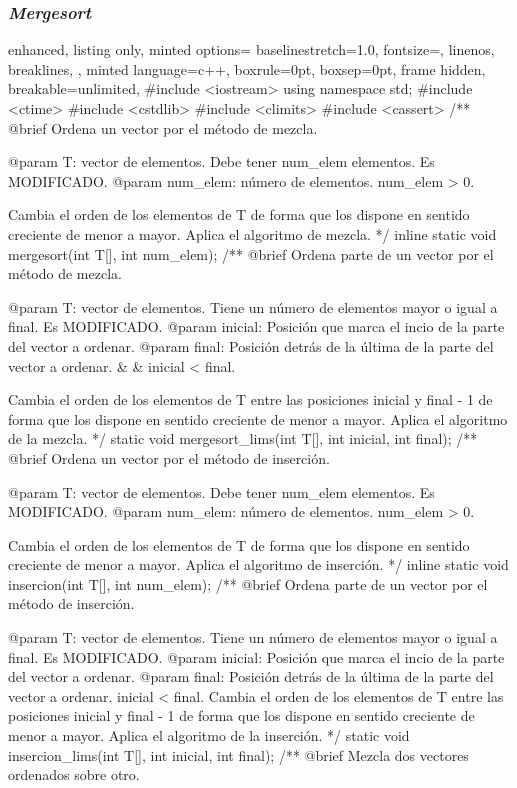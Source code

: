 \documentclass[12pt,spanish]{article}
\begin{document}
\subsubsection{\textit{Mergesort}}

\begin{multicols}{2}
\begin{tcblisting}
{
  enhanced,
  listing only,
  minted options={
    baselinestretch=1.0,
    fontsize=\footnotesize,
    linenos,
    breaklines,
  },
  minted language=c++,
  boxrule=0pt,
  boxsep=0pt,
  frame hidden,
  breakable=unlimited,
} 
#include <iostream>
using namespace std;
#include <ctime>
#include <cstdlib>
#include <climits>
#include <cassert>
/**
   @brief Ordena un vector por el método de mezcla.

   @param T: vector de elementos. Debe tener num_elem elementos.
             Es MODIFICADO.
   @param num_elem: número de elementos. num_elem > 0.

   Cambia el orden de los elementos de T de forma que los dispone
   en sentido creciente de menor a mayor. Aplica el algoritmo de mezcla.
*/
inline static 
void mergesort(int T[], int num_elem);
/**
   @brief Ordena parte de un vector por el método de mezcla.

   @param T: vector de elementos. Tiene un número de elementos 
                   mayor o igual a final. Es MODIFICADO.
   @param inicial: Posición que marca el incio de la parte del
                   vector a ordenar.
   @param final: Posición detrás de la última de la parte del
                   vector a ordenar. 
 &  &    inicial < final.

   Cambia el orden de los elementos de T entre las posiciones
   inicial y final - 1 de forma que los dispone en sentido creciente
   de menor a mayor. Aplica el algoritmo de la mezcla.
*/
static void mergesort_lims(int T[], int inicial, int final);
/**
   @brief Ordena un vector por el método de inserción.

   @param T: vector de elementos. Debe tener num_elem elementos.
             Es MODIFICADO.
   @param num_elem: número de elementos. num_elem > 0.

   Cambia el orden de los elementos de T de forma que los dispone
   en sentido creciente de menor a mayor. Aplica el algoritmo de inserción.
*/
inline static 
void insercion(int T[], int num_elem);
/**
   @brief Ordena parte de un vector por el método de inserción.

   @param T: vector de elementos. Tiene un número de elementos 
                   mayor o igual a final. Es MODIFICADO.
   @param inicial: Posición que marca el incio de la parte del
                   vector a ordenar.
   @param final: Posición detrás de la última de la parte del
                   vector a ordenar. inicial < final.
   Cambia el orden de los elementos de T entre las posiciones
   inicial y final - 1 de forma que los dispone en sentido creciente
   de menor a mayor. Aplica el algoritmo de la inserción.
*/
static void insercion_lims(int T[], int inicial, int final);
/**
   @brief Mezcla dos vectores ordenados sobre otro.


\end{tcblisting}
\end{multicols}
\end{document}
